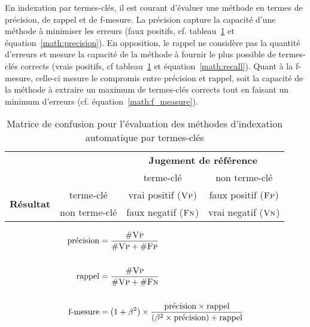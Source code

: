     En indexation par termes-clés, il est courant d'évaluer une méthode en
    termes de précision, de rappel et de f-mesure. La précision capture la
    capacité d'une méthode à minimiser les erreurs (faux positifs, cf.
    tableau~\ref{tab:confusion_matrix} et équation~\ref{math:precision}). En
    opposition, le rappel ne considère pas la quantité d'erreurs et mesure la
    capacité de la méthode à fournir le plus possible de termes-clés corrects
    (vrais positifs, cf tableau~\ref{tab:confusion_matrix} et
    équation~\ref{math:recall}). Quant à la f-mesure, celle-ci mesure le
    compromis entre précision et rappel, soit la capacité de la méthode à
    extraire un maximum de termes-clés corrects tout en faisant un minimum
    d'erreurs (cf. équation~\ref{math:f_measure}).
    \begin{table}
      \begin{center}
        \begin{tabular}{cc|cc}
          \toprule
          \multicolumn{2}{c|}{} & \multicolumn{2}{c}{\textbf{Jugement de référence}}\\
          \multicolumn{2}{c|}{} & \og{}terme-clé\fg{} & \og{}non terme-clé\fg{}\\
          \hline
          \multirow{2}{*}{\textbf{Résultat}} & \og{}terme-clé\fg{} & vrai positif ($\textsc{Vp}$) & faux positif ($\textsc{Fp}$)\\
          & \og{}non terme-clé\fg{} & faux negatif ($\textsc{Fn}$) & vrai negatif ($\textsc{Vn}$)\\
          \bottomrule
        \end{tabular}
        \caption{Matrice de confusion pour l'évaluation des méthodes
                 d'indexation automatique par termes-clés
                \label{tab:confusion_matrix}}
      \end{center}
    \end{table}
    \begin{align}
      \text{précision} &= \frac{\#\textsc{Vp}}{\#\textsc{Vp} + \#\textsc{Fp}} \label{math:precision}\\
      \notag\\
      \text{rappel} &= \frac{\#\textsc{Vp}}{\#\textsc{Vp} + \#\textsc{Fn}} \label{math:recall}\\
      \notag\\
      \text{f-mesure} &= (1 + \beta^2) \times \frac{\text{précision} \times \text{rappel}}{(\beta^2 \times \text{précision}) + \text{rappel}} \label{math:f_measure}
    \end{align}
      

